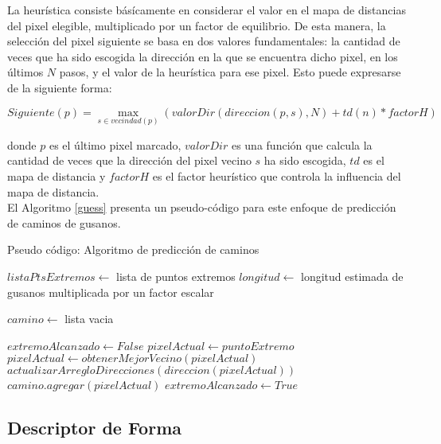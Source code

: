 La heur\'istica consiste b\'as\'icamente en considerar el valor en el mapa de distancias
del pixel elegible, multiplicado por un factor de equilibrio. De esta manera, la 
selecci\'on del pixel siguiente se basa en dos valores fundamentales: la cantidad
de veces que ha sido escogida la direcci\'on en la que se encuentra dicho pixel, 
en los \'ultimos $N$ pasos, y el valor de la heur\'istica para ese pixel. Esto
puede expresarse de la siguiente forma:

$$Siguiente(p) = \max_{s \in vecindad(p)} (valorDir(direccion(p,s),N) + td(n)*factorH)$$

donde $p$ es el \'ultimo pixel marcado, $valorDir$ es una funci\'on que calcula
la cantidad de veces que la direcci\'on del pixel vecino $s$ ha sido escogida, $td$ es el 
mapa de distancia y $factorH$ es el factor heur\'istico que controla la influencia 
del mapa de distancia.\\


El Algoritmo \ref{guess} presenta un pseudo-c\'odigo para este enfoque de predicci\'on
de caminos de gusanos.

\begin{algorithm}[h]                    
\caption{Pseudo c\'odigo: Algoritmo de predicci\'on de caminos}
\label{guess}                    
\begin{algorithmic}                   

\STATE $listaPtsExtremos \leftarrow$ lista de puntos extremos
\STATE $longitud \leftarrow$ longitud estimada de gusanos multiplicada por un factor escalar
\STATE {}
\ENDIF
{}

\STATE $camino \leftarrow$ lista vacia

\STATE $extremoAlcanzado \leftarrow False$
\STATE $pixelActual \leftarrow puntoExtremo$
\STATE $pixelActual \leftarrow obtenerMejorVecino(pixelActual)$
\STATE $actualizarArregloDirecciones(direccion(pixelActual))$
\STATE $camino.agregar(pixelActual)$
\STATE $extremoAlcanzado \leftarrow True$
\ENDIF
\ENDWHILE 

\ENDFOR

\end{algorithmic}
\end{algorithm}

\subsection{Descriptor de Forma}
\label{sec:metshapedescriptor}

